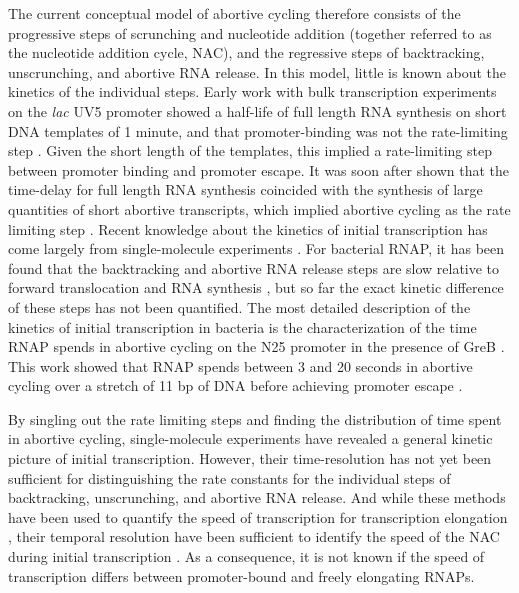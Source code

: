 The current conceptual model of abortive cycling therefore consists of the
progressive steps of scrunching and nucleotide addition (together referred to
as the nucleotide addition cycle, NAC), and the regressive steps of
backtracking, unscrunching, and abortive RNA release. In this model, little is
known about the kinetics of the individual steps. Early work with bulk
transcription experiments on the \textit{lac} UV5 promoter showed a half-life
of full length RNA synthesis on short DNA templates of 1 minute, and that
promoter-binding was not the rate-limiting step \cite{stefano_lac_1979}. Given
the short length of the templates, this implied a rate-limiting step between
promoter binding and promoter escape. It was soon after shown that the
time-delay for full length RNA synthesis coincided with the synthesis of large
quantities of short abortive transcripts, which implied abortive cycling as
the rate limiting step \cite{munson_abortive_1981}. Recent knowledge about the
kinetics of initial transcription has come largely from single-molecule
experiments \cite{revyakin_abortive_2006, kapanidis_initial_2006,
tang_real-time_2009, kapanidis_retention_2005, margeat_direct_2006}. For
bacterial RNAP, it has been found that the backtracking and abortive RNA
release steps are slow relative to forward translocation and RNA synthesis
\cite{revyakin_abortive_2006, margeat_direct_2006}, but so far the exact
kinetic difference of these steps has not been quantified. The most detailed
description of the kinetics of initial transcription in bacteria is the
characterization of the time RNAP spends in abortive cycling on the N25
promoter in the presence of GreB \cite{revyakin_abortive_2006}. This work
showed that RNAP spends between 3 and 20 seconds in abortive cycling over a
stretch of 11 bp of DNA before achieving promoter escape
\cite{revyakin_abortive_2006}.

By singling out the rate limiting steps and finding the distribution of time
spent in abortive cycling, single-molecule experiments have revealed a general
kinetic picture of initial transcription. However, their time-resolution has
not yet been sufficient for distinguishing the rate constants for the
individual steps of backtracking, unscrunching, and abortive RNA release. And
while these methods have been used to quantify the speed of transcription for
transcription elongation \cite{wang_force_1998,
tolic-norrelykke_diversity_2004}, their temporal resolution have been
sufficient to identify the speed of the NAC during initial transcription
\cite{revyakin_abortive_2006, margeat_direct_2006}. As a consequence, it is
not known if the speed of transcription differs between promoter-bound and
freely elongating RNAPs.

